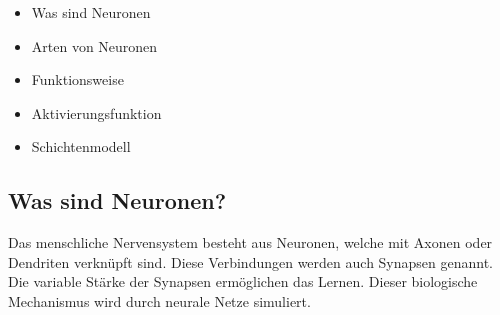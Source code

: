 \begin{tcolorbox}[title={Inhalt}]
\begin{itemize} 
    \item Was sind Neuronen
    \item Arten von Neuronen
    \item Funktionsweise
    \item Aktivierungsfunktion
    \item Schichtenmodell
\end{itemize} 
\end{tcolorbox}
\subsection{Was sind Neuronen?}\label{sec:neuronen:was_sind_neuronen}  
Das menschliche Nervensystem besteht aus Neuronen, welche mit Axonen oder Dendriten verknüpft sind. Diese Verbindungen werden auch Synapsen genannt. Die variable Stärke der Synapsen
ermöglichen das Lernen. Dieser biologische Mechanismus wird durch neurale Netze simuliert.\\

